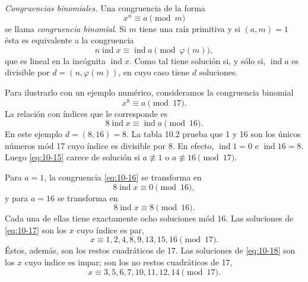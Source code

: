 \documentclass[12pt,a4paper]{book}
\begin{document}
    \begin{ejemplo}
        \textit{Congruencias binomiales.} Una congruencia de la forma
        \begin{equation*}
            x^{n}\equiv a\pmod{m}
        \end{equation*}
        se llama \textit{congruencia binomial}. Si $m$ tiene una raíz primitiva y si
        $(a,m)=1$ ésta es equivalente a la congruencia
        \begin{equation*}
            n\operatorname{ind}x\equiv\operatorname{ind}a\pmod{\varphi(m)},
        \end{equation*}
        que es lineal en la incógnita $\operatorname{ind}x$. Como tal tiene solución si, y
        sólo si, $\operatorname{ind}a$ es divisible por $d=(n,\varphi(m))$, en cuyo caso
        tiene $d$ soluciones.

        Para ilustrarlo con un ejemplo numérico, consideramos la congruencia binomial
        \begin{equation}\label{eq:10-15}
            x^{8}\equiv a\pmod{17}.
        \end{equation}
        La relación con índices que le corresponde es
        \begin{equation}\label{eq:10-16}
            8\operatorname{ind}x\equiv\operatorname{ind}a\pmod{16}.
        \end{equation}
        En este ejemplo $d=(8,16)=8$. La tabla 10.2 prueba que 1 y 16 son los únicos números
        mód 17 cuyo índice es divisible por 8. En efecto, $\operatorname{ind}1=0$ e
        $\operatorname{ind}16=8$. Luego \eqref{eq:10-15} carece de solución si
        $a\not\equiv1$ o $a\not\equiv16\pmod{17}$.

        Para $a=1$, la congruencia \eqref{eq:10-16} se transforma en
        \begin{equation}\label{eq:10-17}
            8\operatorname{ind}x\equiv0\pmod{16},
        \end{equation}
        y para $a=16$ se transforma en
        \begin{equation}\label{eq:10-18}
            8\operatorname{ind}x\equiv8\pmod{16}.
        \end{equation}
        Cada una de ellas tiene exactamente ocho soluciones mód 16. Las soluciones de
        \eqref{eq:10-17} son los $x$ cuyo índice es par,
        \begin{equation*}
            x\equiv1,2,4,8,9,13,15,16\pmod{17}.
        \end{equation*}
        Éstos, además, son los restos cuadráticos de 17. Las soluciones de
        \eqref{eq:10-18} son los $x$ cuyo índice es impar; son los no restos cuadráticos de
        17,
        \begin{equation*}
            x\equiv3,5,6,7,10,11,12,14\pmod{17}.
        \end{equation*}
    \end{ejemplo}
\end{document}
